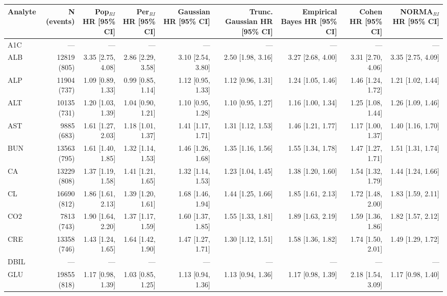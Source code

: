 \begin{table}[ht]
\centering
\footnotesize
\begin{tabular}{lrrrrrrrr}
\toprule
Analyte & N (events) & Pop$_{RI}$ HR [95\% CI] & Per$_{RI}$ HR [95\% CI] & Gaussian HR [95\% CI] & Trunc. Gaussian HR [95\% CI] & Empirical Bayes HR [95\% CI] & Cohen HR [95\% CI] & NORMA$_{RI}$ HR [95\% CI] \\
\midrule
A1C & --- & --- & --- & --- & --- & --- & --- & --- \\
ALB & 12819 (805) & 3.35 [2.75, 4.08] & 2.86 [2.29, 3.58] & 3.10 [2.54, 3.80] & 2.50 [1.98, 3.16] & 3.27 [2.68, 4.00] & 3.31 [2.70, 4.06] & 3.35 [2.75, 4.09] \\
ALP & 11904 (737) & 1.09 [0.89, 1.33] & 0.99 [0.85, 1.14] & 1.12 [0.95, 1.33] & 1.12 [0.96, 1.31] & 1.24 [1.05, 1.46] & 1.46 [1.24, 1.72] & 1.21 [1.02, 1.44] \\
ALT & 10135 (731) & 1.20 [1.03, 1.39] & 1.04 [0.90, 1.21] & 1.10 [0.95, 1.28] & 1.10 [0.95, 1.27] & 1.16 [1.00, 1.34] & 1.25 [1.08, 1.44] & 1.26 [1.09, 1.46] \\
AST & 9885 (683) & 1.61 [1.27, 2.03] & 1.18 [1.01, 1.37] & 1.41 [1.17, 1.71] & 1.31 [1.12, 1.53] & 1.46 [1.21, 1.77] & 1.17 [1.00, 1.37] & 1.40 [1.16, 1.70] \\
BUN & 13563 (795) & 1.61 [1.40, 1.85] & 1.32 [1.14, 1.53] & 1.46 [1.26, 1.68] & 1.35 [1.16, 1.56] & 1.55 [1.34, 1.78] & 1.47 [1.27, 1.71] & 1.51 [1.31, 1.74] \\
CA & 13229 (808) & 1.37 [1.19, 1.58] & 1.41 [1.21, 1.65] & 1.32 [1.14, 1.53] & 1.23 [1.04, 1.45] & 1.38 [1.20, 1.60] & 1.54 [1.32, 1.79] & 1.44 [1.24, 1.66] \\
CL & 16690 (812) & 1.86 [1.61, 2.13] & 1.39 [1.20, 1.61] & 1.68 [1.46, 1.94] & 1.44 [1.25, 1.66] & 1.85 [1.61, 2.13] & 1.72 [1.48, 2.00] & 1.83 [1.59, 2.11] \\
CO2 & 7813 (743) & 1.90 [1.64, 2.20] & 1.37 [1.17, 1.59] & 1.60 [1.37, 1.85] & 1.55 [1.33, 1.81] & 1.89 [1.63, 2.19] & 1.59 [1.36, 1.86] & 1.82 [1.57, 2.12] \\
CRE & 13358 (746) & 1.43 [1.24, 1.65] & 1.64 [1.42, 1.90] & 1.47 [1.27, 1.71] & 1.30 [1.12, 1.51] & 1.58 [1.36, 1.82] & 1.74 [1.50, 2.01] & 1.49 [1.29, 1.72] \\
DBIL & --- & --- & --- & --- & --- & --- & --- & --- \\
GLU & 19855 (818) & 1.17 [0.98, 1.39] & 1.03 [0.85, 1.25] & 1.13 [0.94, 1.36] & 1.13 [0.94, 1.36] & 1.17 [0.98, 1.39] & 2.18 [1.54, 3.09] & 1.17 [0.98, 1.40] \\

\end{tabular}
\end{table}
